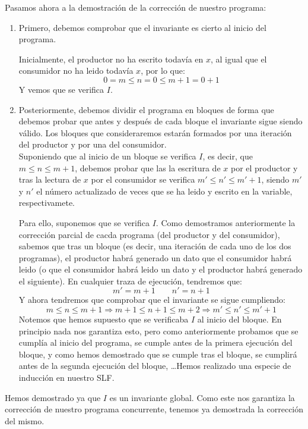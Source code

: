 \begin{ejemplo}
Pasamos ahora a la demostración de la corrección de nuestro programa:
\begin{enumerate}
    \item Primero, debemos comprobar que el invariante es cierto al inicio del programa.
    
        Inicialmente, el productor no ha escrito todavía en $x$, al igual que el consumidor no ha leido todavía $x$, por lo que:
        \begin{equation*}
            0 = m \leq n = 0 \leq m+1 = 0+1
        \end{equation*}
        Y vemos que se verifica $I$.
    \item Posteriormente, debemos dividir el programa en bloques de forma que debemos probar que antes y después de cada bloque el invariante sigue siendo válido. Los bloques que consideraremos estarán formados por una iteración del productor y por una del consumidor.\\

        Suponiendo que al inicio de un bloque se verifica $I$, es decir, que $m\leq n\leq m+1$, debemos probar que las la escritura de $x$ por el productor y tras la lectura de $x$ por el consumidor se verifica $m'\leq n' \leq m'+1$, siendo $m'$ y $n'$ el número actualizado de veces que se ha leido y escrito en la variable, respectivamete.

        Para ello, suponemos que se verifica $I$. Como demostramos anteriormente la corrección parcial de cacda programa (del productor y del consumidor), sabemos que tras un bloque (es decir, una iteración de cada uno de los dos programas), el productor habrá generado un dato que el consumidor habrá leido (o que el consumidor habrá leido un dato y el productor habrá generado el siguiente). En cualquier traza de ejecución, tendremos que:
        \begin{equation*}
            m' = m+1 \qquad n' = n+1
        \end{equation*}
        Y ahora tendremos que comprobar que el invariante se sigue cumpliendo:
        \begin{equation*}
            m\leq n\leq m+1 \Longrightarrow m+1\leq n+1\leq m+2 \Longrightarrow m' \leq n' \leq m'+1
        \end{equation*}
        Notemos que hemos supuesto que se verificaba $I$ al inicio del bloque. En principio nada nos garantiza esto, pero como anteriormente probamos que se cumplía al inicio del programa, se cumple antes de la primera ejecución del bloque, y como hemos demostrado que se cumple tras el bloque, se cumplirá antes de la segunda ejecución del bloque, \ldots Hemos realizado una especie de inducción en nuestro SLF.
\end{enumerate}
Hemos demostrado ya que $I$ es un invariante global. Como este nos garantiza la corrección de nuestro programa concurrente, tenemos ya demostrada la corrección del mismo.
\end{ejemplo}
